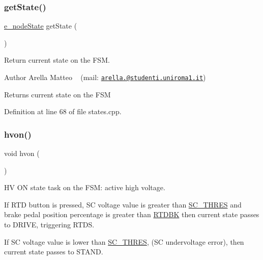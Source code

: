 \subsubsection{\texorpdfstring{get\+State()}{getState()}}
{\footnotesize\ttfamily \mbox{\hyperlink{group__stages__group_ga29e04432d3efcac24a5ae62572a6e8f2}{e\+\_\+node\+State}} get\+State (\begin{DoxyParamCaption}{ }\end{DoxyParamCaption})}



Return current state on the F\+SM. 

\begin{DoxyAuthor}{Author}
Arella Matteo ~\newline
 (mail\+: \href{mailto:arella.1646983@studenti.uniroma1.it}{\tt arella.@studenti.\+uniroma1.\+it})
\end{DoxyAuthor}
\begin{DoxyReturn}{Returns}
current state on the F\+SM 
\end{DoxyReturn}


Definition at line 68 of file states.\+cpp.

\mbox{\label{group__stages__group_ga6fada8f571df828c8fe6b920e2558c37}} 
\subsubsection{\texorpdfstring{hvon()}{hvon()}}
{\footnotesize\ttfamily void hvon (\begin{DoxyParamCaption}{ }\end{DoxyParamCaption})}



HV ON state task on the F\+SM\+: active high voltage. 

If R\+TD button is pressed, SC voltage value is greater than \mbox{\hyperlink{group__stages__group_ga9688af4f17ae88b4d149269d71b7ff1f}{S\+C\+\_\+\+T\+H\+R\+ES}} and brake pedal position percentage is greater than \mbox{\hyperlink{group__stages__group_ga87841f6a3eeb660263b624e20c4f072f}{R\+T\+D\+BK}} then current state passes to D\+R\+I\+VE, triggering R\+T\+DS.

If SC voltage value is lower than \mbox{\hyperlink{group__stages__group_ga9688af4f17ae88b4d149269d71b7ff1f}{S\+C\+\_\+\+T\+H\+R\+ES}}, (SC undervoltage error), then current state passes to S\+T\+A\+ND.

